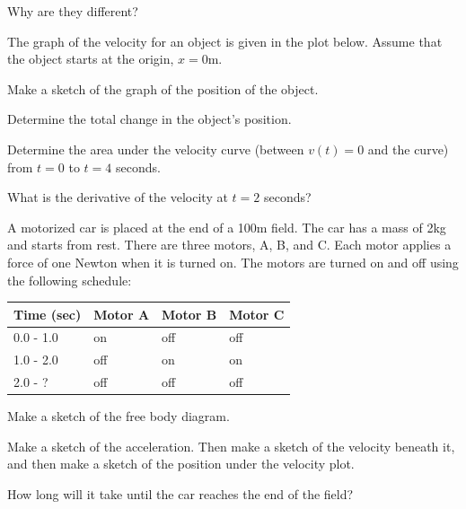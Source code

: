 \begin{problem}
  \item Why are they different?

    \vfill

  \clearpage

\item The graph of the velocity for an object is given in the plot
  below. Assume that the object starts at the origin, $x=0$m.

  \scalebox{0.7}{}

  \begin{subproblem}
  \item Make a sketch of the graph of the position of the object.
    \item Determine the total change in the object's position.
      \vfill
    \item Determine the area under the velocity curve (between $v(t)=0$
      and the curve) from $t=0$ to $t=4$ seconds.
      \vfill
    \item What is the derivative of the velocity at $t=2$ seconds?
      \vspace{1em}
  \end{subproblem}

  \clearpage

\item A motorized car is placed at the end of a 100m field. The car
  has a mass of 2kg and starts from rest. There are three motors, A,
  B, and C. Each motor applies a force of one Newton when it is turned
  on. The motors are
  turned on and off using the following schedule: \\
  \begin{tabular}{l|lll}
    Time (sec) & Motor A & Motor B & Motor C \\ \hline
    0.0 - 1.0  & on      & off     & off     \\
    1.0 - 2.0  & off     & on      & on      \\
    2.0 - ?    & off     & off     & off
  \end{tabular}
  \label{newtonsLawMotorizedCar}

  \begin{subproblem}
  \item Make a sketch of the free body diagram.
    \vspace{8em}
  \item Make a sketch of the acceleration. Then make a sketch of the
    velocity beneath it, and then make a sketch of the position under
    the velocity plot.
    \vfill
    \clearpage
  \item How long will it take until the car reaches the end of the
    field?
    \vfill
  \end{subproblem}

\end{problem}

